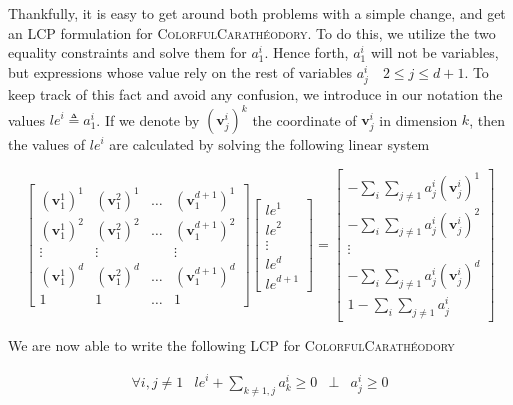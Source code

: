 \documentclass[a4paper,11pt]{article}
\def\problem#1{\textsc{#1}}
\def\v{\textbf{v}}
\def\CCP{\problem{ColorfulCarath\'eodory}\xspace}
\begin{document}
\par Thankfully, it is easy to get around both problems with a simple change, and get an LCP formulation for \CCP.
To do this, we utilize the two equality constraints and solve them for $a^i_1$. Hence forth, $a^i_1$ will not be
variables, but expressions whose value rely on the rest of variables $a^i_j \quad 2 \leq j \leq d + 1$. To keep track
of this fact and avoid any confusion, we introduce in our notation the values ${le}^i \triangleq a^i_1$. If we denote
by ${(\v^i_j)}^k$ the coordinate of $\v^i_j$ in dimension $k$, then the values of ${le}^i$ are calculated
by solving the following linear system

\begin{equation}\label{lei}
\begin{bmatrix}
{(\v^1_1)}^1 & {(\v^2_1)}^1 & \hdots & {(\v^{d+1}_1)}^1 \\
{(\v^1_1)}^2 & {(\v^2_1)}^2 & \hdots & {(\v^{d+1}_1)}^2 \\
\vdots & \vdots & & \vdots \\
{(\v^1_1)}^d & {(\v^2_1)}^d & \hdots & {(\v^{d+1}_1)}^d \\
1 & 1 & \hdots & 1
\end{bmatrix}
\begin{bmatrix}
{le}^1 \\ {le}^2 \\ \vdots \\ {le}^d \\ {le}^{d+1}
\end{bmatrix} =
\begin{bmatrix}
- \sum_i {\sum_{j \neq 1} {a^i_j {(\v^i_j)}^1 }} \\
- \sum_i {\sum_{j \neq 1} {a^i_j {(\v^i_j)}^2 }} \\
\vdots \\
- \sum_i {\sum_{j \neq 1} {a^i_j {(\v^i_j)}^d }} \\
1 - \sum_i {\sum_{j \neq 1} {a^i_j}}
\end{bmatrix}
\end{equation}

\par We are now able to write the following LCP for \CCP

\begin{equation}\label{lcp1}
\begin{array}{lccl}
\forall i, j \neq 1 & {le}^i + \sum_{k \neq 1, j} {a^i_k} \geq 0 & \bot & a^i_j \geq 0
\end{array}
\end{equation}
\end{document}

